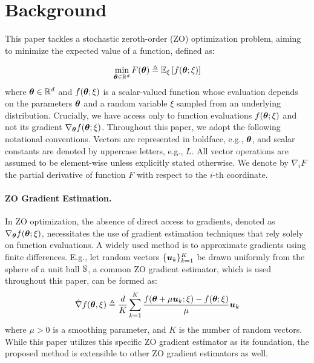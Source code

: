 \section{Background}
This paper tackles a stochastic zeroth-order (ZO) optimization problem, aiming to minimize the expected value of a function, defined as:

\begin{equation}
\min_{{\bm{\theta}} \in {\mathbb{R}}^d} F({\bm{\theta}}) \triangleq \mathbb{E}_{\xi}\left[f({\bm{\theta}}; \xi)\right]
\end{equation}
where ${\bm{\theta}} \in \mathbb{R}^d$ and $f({\bm{\theta}}; \xi)$ is a scalar-valued function whose evaluation depends on the parameters ${\bm{\theta}}$ and a random variable $\xi$ sampled from an underlying distribution. Crucially, we have access only to function evaluations $f({\bm{\theta}}; \xi)$ and not its gradient $\nabla_{{\bm{\theta}}} f({\bm{\theta}}; \xi)$. 
Throughout this paper, we adopt the following notational conventions. Vectors are represented in boldface, e.g., ${\bm{\theta}}$, and scalar constants are denoted by uppercase letters, e.g., $L$. All vector operations are assumed to be element-wise unless explicitly stated otherwise. We denote by $\nabla_i F$ the partial derivative of function $F$ with respect to the $i$-th coordinate.

\paragraph{ZO Gradient Estimation.} In ZO optimization, the absence of direct access to gradients, denoted as $\nabla_{{\bm{\theta}}} f({\bm{\theta}}; \xi)$, necessitates the use of gradient estimation techniques that rely solely on function evaluations. A widely used method is to approximate gradients using finite differences. E.g., let random vectors $\{{\bm{u}}_k\}_{k=1}^K$ be drawn uniformly from the sphere of a unit ball ${\mathbb{S}}$, a common ZO gradient estimator, which is used throughout this paper, can be formed as:
\begin{equation}\label{eq:fd}
\hat{\nabla} f({\bm{\theta}}, \xi) \triangleq \frac{d}{K}\sum_{k=1}^K\frac{f({\bm{\theta}} + \mu {\bm{u}}_k; \xi) - f({\bm{\theta}}; \xi)}{\mu} {\bm{u}}_k
\end{equation}
where $\mu > 0$ is a smoothing parameter, and $K$ is the number of random vectors. While this paper utilizes this specific ZO gradient estimator as its foundation, the proposed method is extensible to other ZO gradient estimators as well.

